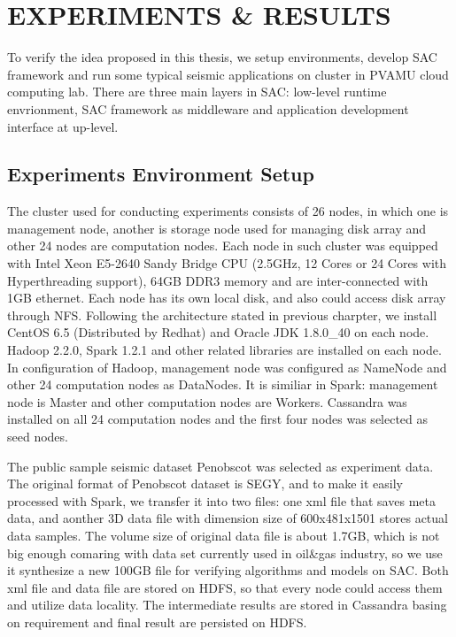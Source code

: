 %
%
%


\chapter{\uppercase{Experiments \& Results}}
To verify the idea proposed in this thesis, we setup environments, develop SAC framework and run some typical seismic applications on cluster in PVAMU cloud computing lab. There are three main layers in SAC: low-level runtime envrionment, SAC framework as middleware and application development interface at up-level. 

\section{Experiments Environment Setup}

The cluster used for conducting experiments consists of 26 nodes, in which one is management node, another is storage node used for managing disk array and other 24 nodes are computation nodes. Each node in such cluster was equipped with Intel Xeon E5-2640 Sandy Bridge CPU (2.5GHz, 12 Cores or 24 Cores with Hyperthreading support), 64GB DDR3 memory and are inter-connected with 1GB ethernet. Each node has its own local disk, and also could access disk array through NFS. Following the architecture stated in previous charpter, we install CentOS 6.5 (Distributed by Redhat) and Oracle JDK 1.8.0\_40 on each node. Hadoop 2.2.0, Spark 1.2.1 and other related libraries are installed on each node. In configuration of Hadoop, management node was configured as NameNode and other 24 computation nodes as DataNodes. It is similiar in Spark: management node is Master and other computation nodes are Workers. Cassandra was installed on all 24 computation nodes and the first four nodes was selected as seed nodes.


The public sample seismic dataset Penobscot \cite{PenobscotData} was selected as experiment data. The original format of Penobscot dataset is SEGY, and to make it easily processed with Spark, we transfer it into two files: one xml file that saves meta data, and aonther 3D data file with dimension size of 600x481x1501 stores actual data samples. The volume size of original data file is about 1.7GB, which is not big enough comaring with data set currently used in oil\&gas industry, so we use it synthesize a new 100GB file for verifying algorithms and models on SAC. Both xml file and data file are stored on HDFS, so that every node could access them and utilize data locality. The intermediate results are stored in Cassandra basing on requirement and final result are persisted on HDFS. 

